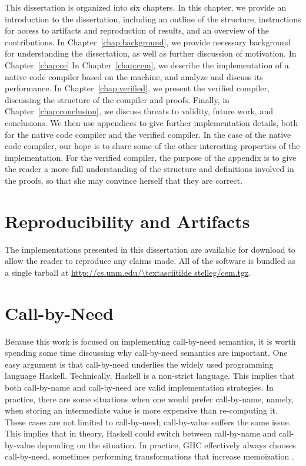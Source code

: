 This dissertation is organized into six chapters. In this chapter, we provide
an introduction to the dissertation, including an outline of the structure,
instructions for access to artifacts and reproduction of results, and an
overview of the contributions. In Chapter~\ref{chap:background}, we provide
necessary background for understanding the dissertation, as well as further
discussion of motivation. In Chapter~\ref{chap:ce}  In Chapter~\ref{chap:cem},
we describe the implementation of a native code compiler based on the \ce
machine, and analyze and discuss its performance. In
Chapter~\ref{chap:verified}, we present the verified compiler, discussing the
structure of the compiler and proofs. Finally, in Chapter~\ref{chap:conclusion},
we discuss threats to validity, future work, and conclusions. We then use
appendices to give further implementation details, both for the native code
compiler and the verified compiler. In the case of the native code compiler, our
hope is to share some of the other interesting properties of the implementation.
For the verified compiler, the purpose of the appendix is to give the reader a
more full understanding of the structure and definitions involved in the proofs,
so that she may convince herself that they are correct.

\section{Reproducibility and Artifacts}

The implementations presented in this dissertation are available for download to
allow the reader to reproduce any claims made. All of the software is bundled as
a single tarball at \url{http://cs.unm.edu/\textasciitilde stelleg/cem.tgz}. 

\section{Call-by-Need}

Because this work is focused on implementing call-by-need semantics, it is worth
spending some time discussing why call-by-need semantics are important. One easy
argument is that call-by-need underlies the widely used programming language
Haskell. Technically, Haskell is a non-strict language. This implies that both
call-by-name and call-by-need are valid implementation strategies. In practice,
there are some situations when one would prefer call-by-name, namely, when
storing an intermediate value is more expensive than re-computing it. These
cases are not limited to call-by-need; call-by-value suffers the same issue.
This implies that in theory, Haskell could switch between call-by-name and
call-by-value depending on the situation. In practice, GHC effectively always
chooses call-by-need, sometimes performing transformations that increase
memoization \cite{jones96floating}.

